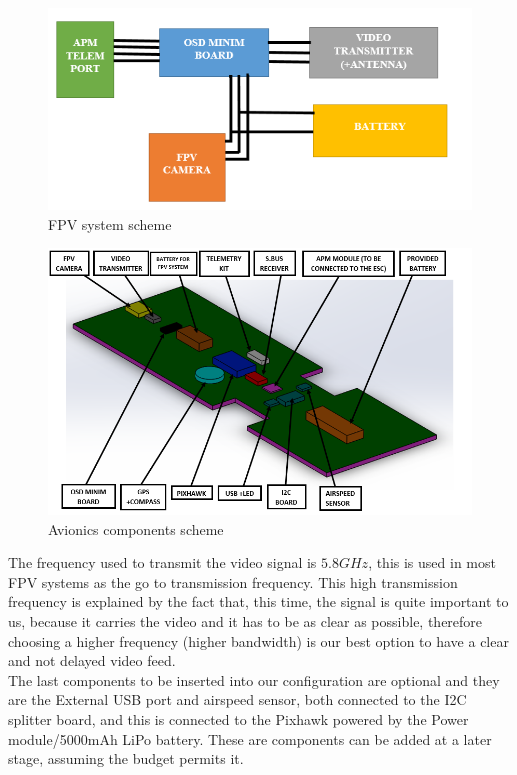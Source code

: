 \documentclass[12pt]{article}
\begin{document}
\begin{figure}[h]
    \centering
    \includegraphics[width=0.70\linewidth]{Diagram.png}
    \caption{FPV system scheme}
    \label{fig:FPV system}
\end{figure}

\begin{figure}[h!]
    \centering
    \includegraphics[width=1\linewidth]{components.png}
    \caption{Avionics components scheme}
    \label{fig:Avionics}
\end{figure}

\noindent The frequency used to transmit the video signal is $5.8GHz$, this is used in most FPV systems as the go to transmission frequency. This high transmission frequency is explained by the fact that, this time, the signal is quite important to us, because it carries the video and it has to be as clear as possible, therefore choosing a higher frequency (higher bandwidth) is our best option to have a clear and not delayed video feed.\cite{SENSOR11} \\

\noindent The last components to be inserted into our configuration are optional and they are the External USB port and airspeed sensor, both connected to the I2C splitter board, and this is connected to the Pixhawk powered by the Power module/5000mAh LiPo battery. These are components can be added at a later stage, assuming the budget permits it.\cite{SENSOR5} \\
\end{document}
